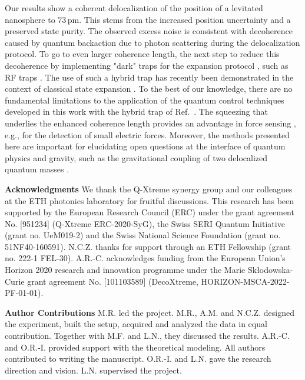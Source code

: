 \documentclass[aps,amssymb,amsmath,prl,superscriptaddress,reprint,noshowpacs]{revtex4-1}
\begin{document}
Our results show a coherent delocalization of the position of a levitated nanosphere to $73\,\mathrm{pm}$.
%
This stems from the increased position uncertainty and a preserved state purity.
%
The observed excess noise is consistent with decoherence caused by quantum backaction due to photon scattering during the delocalization protocol.
%
To go to even larger coherence length, the next step to reduce this decoherence by implementing "dark" traps for the expansion protocol \cite{pino_-chip_2018,roda-llordes_macroscopic_2023}, such as RF traps \cite{conangla_extending_2020, bykov_hybrid_2022}. 
%
The use of such a hybrid trap has recently been demonstrated in the context of  classical state expansion \cite{bonvin_state_2023}.
%
To the best of our knowledge, there are no fundamental limitations to the application of the quantum control techniques developed in this work with the hybrid trap of Ref.~\cite{bonvin_state_2023}. 
%
The squeezing that underlies the enhanced coherence length  provides an advantage in force sensing \cite{burd_quantum_2019}, e.g., for the detection of small electric forces. 
%
Moreover, the methods presented here are important for elucidating open questions at the interface of quantum physics and gravity, such as the gravitational coupling of two delocalized quantum masses \cite{dewitt_role_2011, marletto_gravitationally_2017, bose_spin_2017, belenchia_quantum_2018}.

\textbf{Acknowledgments} We thank the Q-Xtreme synergy group and our colleagues at the ETH photonics laboratory for fruitful discussions. This research has been supported by the European Research Council (ERC) under the grant agreement No. [951234] (Q-Xtreme ERC-2020-SyG), the Swiss SERI Quantum Initiative (grant no. UeM019-2) and the Swiss National Science Foundation (grant no. 51NF40-160591). N.C.Z. thanks for support through an ETH Fellowship (grant no. 222-1 FEL-30). A.R.-C. acknowledges funding from the European Union’s Horizon 2020 research and innovation programme under the Marie Skłodowska-Curie grant agreement No. [101103589] (DecoXtreme, HORIZON-MSCA-2022-PF-01-01).

\textbf{Author Contributions} 
M.R. led the project.
M.R., A.M. and N.C.Z. designed the experiment, built the setup, acquired and analyzed the data in equal contribution. Together with M.F. and L.N., they discussed the results. A.R.-C. and O.R.-I. provided support with the theoretical modeling. All authors contributed to writing the manuscript. O.R.-I. and L.N. gave the research direction and vision. L.N. supervised the project.



\end{document}
